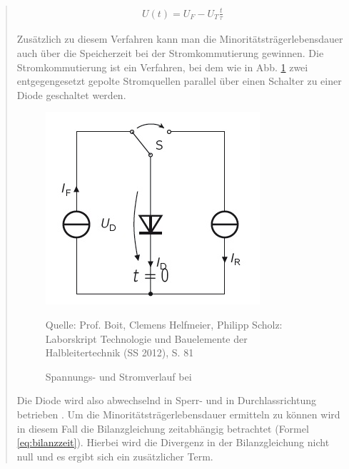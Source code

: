 \begin{quote}
	\begin{equation}
         \begin{split}
             U(t)=U_{F}-U_{T}\frac{t}{\tau}
         \end{split}
         \label{eq:gerade}
    \end{equation}
	
	Zusätzlich zu diesem Verfahren kann man die Minoritätsträgerlebensdauer auch
	über die Speicherzeit bei der Stromkommutierung gewinnen. Die 
	Stromkommutierung ist ein Verfahren, bei dem wie in Abb. \ref{fig:komm} zwei 
	entgegengesetzt gepolte Stromquellen parallel über einen Schalter zu einer 
	Diode geschaltet werden.  
	
	\vspace{2em}
	
	\begin{figure}[H]
        \centering
        \includegraphics[scale=1]{./SchaltverhaltenBilder/Kommutierschaltung.jpg}
        \caption{Spannungs- und Stromverlauf bei }
             \begin{center}
                 \small Quelle: Prof. Boit, Clemens Helfmeier, Philipp Scholz: Laborskript Technologie und Bauelemente der Halbleitertechnik (SS 2012), S. 81
             \end{center} 
        \label{fig:komm}
    \end{figure}
	
	\vspace{2em}
	
	Die Diode wird also abwechselnd in Sperr- und in Durchlassrichtung betrieben
	. Um die Minoritätsträgerlebensdauer ermitteln zu können wird in diesem Fall
	die Bilanzgleichung zeitabhängig betrachtet (Formel \ref{eq:bilanzzeit}). 
	Hierbei wird die Divergenz in der Bilanzgleichung nicht null und es ergibt 
	sich ein zusätzlicher Term.
	

\end{quote}
